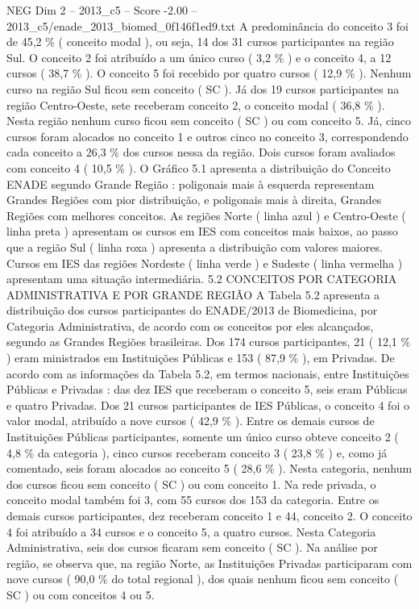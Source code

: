 \begin{textsample}{NEG Dim 2 – 2013\_c5 – Score -2.00 – 2013\_c5/enade\_2013\_biomed\_0f146f1ed9.txt}
A predominância do conceito 3 foi de 45,2 \% ( conceito modal ), ou seja, 14 dos 31 cursos participantes na região Sul.
O conceito 2 foi atribuído a um único curso ( 3,2 \% ) e o conceito 4, a 12 cursos ( 38,7 \% ).
O conceito 5 foi recebido por quatro cursos ( 12,9 \% ).
Nenhum curso na região Sul ficou sem conceito ( SC ).
Já dos 19 cursos participantes na região Centro-Oeste, sete receberam conceito 2, o conceito modal ( 36,8 \% ).
Nesta região nenhum curso ficou sem conceito ( SC ) ou com conceito 5.
Já, cinco cursos foram alocados no conceito 1 e outros cinco no conceito 3, correspondendo cada conceito a 26,3 \% dos cursos nessa da região.
Dois cursos foram avaliados com conceito 4 ( 10,5 \% ).
O Gráfico 5.1 apresenta a distribuição do Conceito ENADE segundo Grande Região : poligonais mais à esquerda representam Grandes Regiões com pior distribuição, e poligonais mais à direita, Grandes Regiões com melhores conceitos.
As regiões Norte ( linha azul ) e Centro-Oeste ( linha preta ) apresentam os cursos em IES com conceitos mais baixos, ao passo que a região Sul ( linha roxa ) apresenta a distribuição com valores maiores.
Cursos em IES das regiões Nordeste ( linha verde ) e Sudeste ( linha vermelha ) apresentam uma situação intermediária. 5.2 CONCEITOS POR CATEGORIA ADMINISTRATIVA E POR GRANDE REGIÃO A Tabela 5.2 apresenta a distribuição dos cursos participantes do ENADE/2013 de Biomedicina, por Categoria Administrativa, de acordo com os conceitos por eles alcançados, segundo as Grandes Regiões brasileiras.
Dos 174 cursos participantes, 21 ( 12,1 \% ) eram ministrados em Instituições Públicas e 153 ( 87,9 \% ), em Privadas.
De acordo com as informações da Tabela 5.2, em termos nacionais, entre Instituições Públicas e Privadas : das dez IES que receberam o conceito 5, seis eram Públicas e quatro Privadas.
Dos 21 cursos participantes de IES Públicas, o conceito 4 foi o valor modal, atribuído a nove cursos ( 42,9 \% ).
Entre os demais cursos de Instituições Públicas participantes, somente um único curso obteve conceito 2 ( 4,8 \% da categoria ), cinco cursos receberam conceito 3 ( 23,8 \% ) e, como já comentado, seis foram alocados ao conceito 5 ( 28,6 \% ).
Nesta categoria, nenhum dos cursos ficou sem conceito ( SC ) ou com conceito 1.
Na rede privada, o conceito modal também foi 3, com 55 cursos dos 153 da categoria.
Entre os demais cursos participantes, dez receberam conceito 1 e 44, conceito 2.
O conceito 4 foi atribuído a 34 cursos e o conceito 5, a quatro cursos.
Nesta Categoria Administrativa, seis dos cursos ficaram sem conceito ( SC ).
Na análise por região, se observa que, na região Norte, as Instituições Privadas participaram com nove cursos ( 90,0 \% do total regional ), dos quais nenhum ficou sem conceito ( SC ) ou com conceitos 4 ou 5.

\end{textsample}
